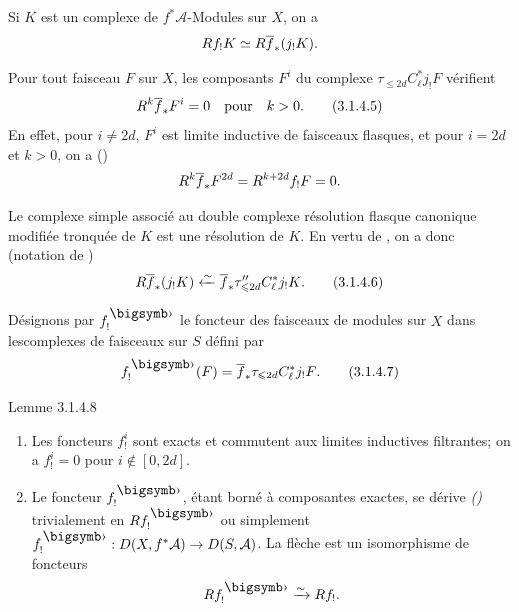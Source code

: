 \documentclass[10pt]{../fichiers-configuration-latex/smfart}
\begin{document}
Si $K$ est un complexe de $f^{\ast}\mathcal{A}$-Modules sur $X$, on a
$$
Rf_{!}K\simeq R\overline{f}_{\ast}(j_{!}K){}.
$$

Pour tout faisceau $F$ sur $X$, les composants $F^{i}$ du complexe
$\tau_{\leq 2d}C^\ast_{\ell}j_{!}F$ vérifient
\begin{equation*}
R^{k}\overline{f}_{\ast}F^{i}=0\quad \text{\rm pour}\quad k>0{}.\tag{3.1.4.5}
\end{equation*}%
En effet, pour $i\neq 2d$, $F^{i}$ est limite inductive de faisceaux
flasques, et pour $i=2d$ et $k>0$, on a ()
$$
R^{k}\overline{f}_{\ast}F^{2d}=R^{k+2d}f_{!}F=0{}.
$$

Le complexe simple associé au double complexe résolution flasque
canonique modifiée tronquée de $K$ est une résolution de $K$. En vertu
de , on a donc (notation de )
\begin{equation*}
R\overline{f}_{\ast}(j_{!}K)\xleftarrow{\sim} \overline{f}_{\ast}\tau''_{\leqslant
2d} C^{\ast}_{\ell}j_{!}K{}.\tag{3.1.4.6}
\end{equation*}

Désignons par $f^{\bigdot}_{!}$ le foncteur des faisceaux de modules
sur $X$ dans les\pageoriginale complexes de faisceaux sur $S$ défini
par
\begin{equation*}
f^{\bigdot}_{!}(F)=\bar{f}_{\ast}\tau_{\leq
2d}C^{\ast}_{\ell}j_{!}F{\quoi}.\tag{3.1.4.7}
\end{equation*}

\begin{enonce*}{Lemme 3.1.4.8}
\begin{enumerate}
\renewcommand{\theenumi}{\roman{enumi}}
\renewcommand{\labelenumi}{(\theenumi)}
\item Les foncteurs $f^{i}_{!}$ sont exacts et commutent aux limites
inductives filtrantes; on a $f^{i}_{!}=0$ pour $i\not\in[0,2d]$.

\item Le foncteur $f^{\bigdot}_{!}$, étant borné à composantes
exactes, se dérive \emph{()} trivialement en
$Rf^{\bigdot}_{!}$ ou simplement
$f^{\bigdot}_{!}:D(X,f^{\ast}\mathcal{A})\rightarrow
D(S,\mathcal{A})$. La flèche  est un isomorphisme de
foncteurs
$$
Rf^{\bigdot}_{!}\xrightarrow{\sim} Rf_{!}{\quoi}.
$$
\end{enumerate}
\end{enonce*}
\end{document}
